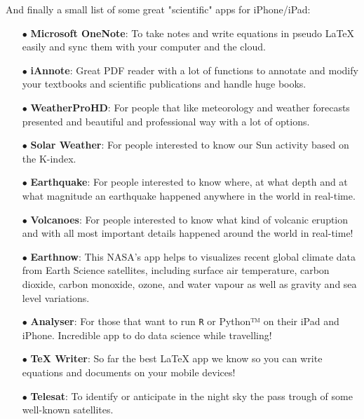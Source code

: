 	\pagebreak
	And finally a small list of some great "scientific" apps for iPhone/iPad:
	\begin{itemize}
		\item[$\bullet$] \textbf{Microsoft OneNote}: To take notes and write equations in pseudo LaTeX easily and sync them with your computer and the cloud.
		
		\item[$\bullet$] \textbf{iAnnote}: Great PDF reader with a lot of functions to annotate and modify your textbooks and scientific publications and handle huge books.
		
		\item[$\bullet$] \textbf{WeatherProHD}: For people that like meteorology and weather forecasts presented and beautiful and professional way with a lot of options.
		
		\item[$\bullet$] \textbf{Solar Weather}: For people interested to know our Sun activity based on the K-index.
		
		\item[$\bullet$] \textbf{Earthquake}: For people interested to know where, at what depth and at what magnitude an earthquake happened anywhere in the world in real-time.
		
		\item[$\bullet$] \textbf{Volcanoes}: For people interested to know what kind of volcanic eruption and with all most important details happened around the world in real-time!
		
		\item[$\bullet$] \textbf{Earthnow}: This NASA's app helps to visualizes recent global climate data from Earth Science satellites, including surface air temperature, carbon dioxide, carbon monoxide, ozone, and water vapour as well as gravity and sea level variations.
		
		\item[$\bullet$] \textbf{Analyser}: For those that want to run \texttt{R} or Python™ on their iPad and iPhone. Incredible app to do data science while travelling!
		
		\item[$\bullet$] \textbf{TeX Writer}: So far the best \LaTeX{} app we know so you can write equations and documents on your mobile devices!
		
		\item[$\bullet$] \textbf{Telesat}: To identify or anticipate in the night sky the pass trough of some well-known satellites.
		

\end{itemize}
